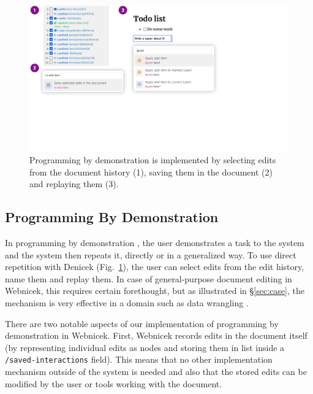 \documentclass[sigconf,anonymous,screen]{acmart}
\begin{document}

\begin{figure}[t]
\includegraphics[width=0.9\columnwidth,clip,trim=0cm 7cm 9cm 0cm]{fig/pbd.pdf}
\caption{Programming by demonstration is implemented by selecting edits from the document
history (1), saving them in the document (2) and replaying them (3).}
\label{fig:pbd}
\end{figure}


\subsection{Programming By Demonstration}
\label{sec:impl-pbd}

In programming by demonstration \cite{cypher-1993-pbd}, the user demonstrates a task to the
system and the system then repeats it, directly or in a generalized way. To use direct
repetition with Denicek (Fig.~\ref{fig:pbd}), the user can select edits from the edit history,
name them and replay them. In case of general-purpose document editing in Webnicek, this requires
certain forethought, but as illustrated in \S\ref{sec:case}, the mechanism is very effective in
a domain such as data wrangling \cite{kandel-2011-wrangler}.

There are two notable aspects of our implementation of programming by demonstration in Webnicek.
First, Webnicek records edits in the document itself (by representing individual edits as nodes and
storing them in list inside a {\small\Verb_/saved-interactions_} field). This means that no other
implementation mechanism outside of the system is needed and also that the stored edits can be
modified by the user or tools working with the document.
\end{document}
